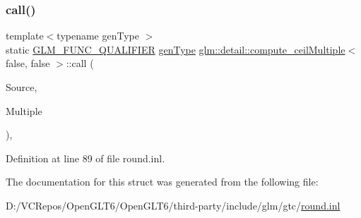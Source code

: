 \subsubsection{\texorpdfstring{call()}{call()}}
{\footnotesize\ttfamily template$<$typename gen\+Type $>$ \\
static \mbox{\hyperlink{setup_8hpp_a33fdea6f91c5f834105f7415e2a64407}{G\+L\+M\+\_\+\+F\+U\+N\+C\+\_\+\+Q\+U\+A\+L\+I\+F\+I\+ER}} \mbox{\hyperlink{structglm_1_1detail_1_1gen_type}{gen\+Type}} \mbox{\hyperlink{structglm_1_1detail_1_1compute__ceil_multiple}{glm\+::detail\+::compute\+\_\+ceil\+Multiple}}$<$ false, false $>$\+::call (\begin{DoxyParamCaption}\item[{\mbox{\hyperlink{structglm_1_1detail_1_1gen_type}{gen\+Type}}}]{Source,  }\item[{\mbox{\hyperlink{structglm_1_1detail_1_1gen_type}{gen\+Type}}}]{Multiple }\end{DoxyParamCaption})\hspace{0.3cm}{\ttfamily [inline]}, {\ttfamily [static]}}



Definition at line 89 of file round.\+inl.



The documentation for this struct was generated from the following file\+:\begin{DoxyCompactItemize}
\item 
D\+:/\+V\+C\+Repos/\+Open\+G\+L\+T6/\+Open\+G\+L\+T6/third-\/party/include/glm/gtc/\mbox{\hyperlink{round_8inl}{round.\+inl}}\end{DoxyCompactItemize}
